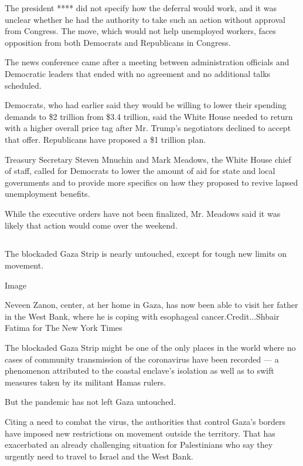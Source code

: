 The president **** did not specify how the deferral would work, and it
was unclear whether he had the authority to take such an action without
approval from Congress. The move, which would not help unemployed
workers, faces opposition from both Democrats and Republicans in
Congress.

The news conference came after a meeting between administration
officials and Democratic leaders that ended with no agreement and no
additional talks scheduled.

Democrats, who had earlier said they would be willing to lower their
spending demands to \$2 trillion from \$3.4 trillion, said the White
House needed to return with a higher overall price tag after Mr. Trump's
negotiators declined to accept that offer. Republicans have proposed a
\$1 trillion plan.

Treasury Secretary Steven Mnuchin and Mark Meadows, the White House
chief of staff, called for Democrats to lower the amount of aid for
state and local governments and to provide more specifics on how they
proposed to revive lapsed unemployment benefits.

While the executive orders have not been finalized, Mr. Meadows said it
was likely that action would come over the weekend.

\hypertarget{section-3}{%
\subsection{}\label{section-3}}

The blockaded Gaza Strip is nearly untouched, except for tough new
limits on movement.

Image

Neveen Zanon, center, at her home in Gaza, has now been able to visit
her father in the West Bank, where he is coping with esophageal
cancer.Credit...Shbair Fatima for The New York Times

The blockaded Gaza Strip might be one of the only places in the world
where no cases of community transmission of the coronavirus have been
recorded --- a phenomenon attributed to the coastal enclave's isolation
as well as to swift measures taken by its militant Hamas rulers.

But the pandemic has not left Gaza untouched.

Citing a need to combat the virus, the authorities that control Gaza's
borders have imposed new restrictions on movement outside the territory.
That has exacerbated an already challenging situation for Palestinians
who say they urgently need to travel to Israel and the West Bank.

